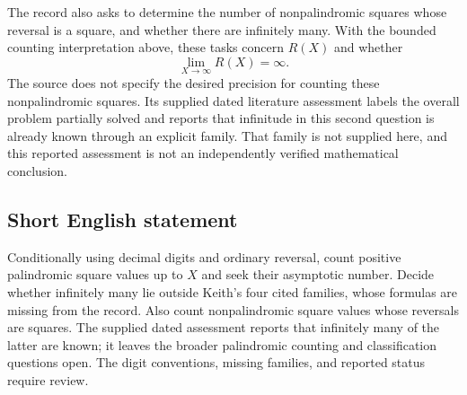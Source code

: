 \documentclass[11pt]{article}
\begin{document}
The record also asks to determine the number of nonpalindromic squares whose reversal is a square, and whether there are infinitely many. With the bounded counting interpretation above, these tasks concern \(R(X)\) and whether
\[
\lim_{X\to\infty}R(X)=\infty.
\]
The source does not specify the desired precision for counting these nonpalindromic squares. Its supplied dated literature assessment labels the overall problem partially solved and reports that infinitude in this second question is already known through an explicit family. That family is not supplied here, and this reported assessment is not an independently verified mathematical conclusion.
\subsection{Short English statement}
Conditionally using decimal digits and ordinary reversal, count positive palindromic square values up to \(X\) and seek their asymptotic number. Decide whether infinitely many lie outside Keith's four cited families, whose formulas are missing from the record. Also count nonpalindromic square values whose reversals are squares. The supplied dated assessment reports that infinitely many of the latter are known; it leaves the broader palindromic counting and classification questions open. The digit conventions, missing families, and reported status require review.
\end{document}
